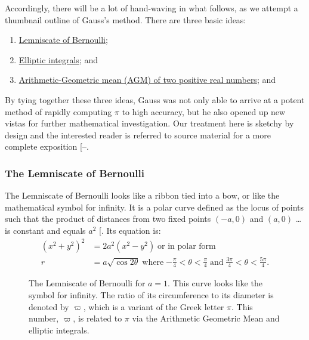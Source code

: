 \documentclass[
  a4paper,
]{article}
\begin{document}
Accordingly, there will be a lot of hand-waving in what follows, as we
attempt a thumbnail outline of Gauss's method. There are three basic
ideas:

\begin{enumerate}
\def\labelenumi{(\alph{enumi})}
\item
  \href{https://mathworld.wolfram.com/Lemniscate.html}{Lemniscate of
  Bernoulli};
\item
  \href{https://en.wikipedia.org/wiki/Elliptic_integral}{Elliptic
  integrals}; and
\item
  \href{https://en.wikipedia.org/wiki/Arithmetic\%E2\%80\%93geometric_mean}{Arithmetic-Geometric
  mean (AGM) of two positive real numbers}; and
\end{enumerate}

By tying together these three ideas, Gauss was not only able to arrive
at a potent method of rapidly computing \(\pi\) to high accuracy, but he
also opened up new vistas for further mathematical investigation. Our
treatment here is sketchy by design and the interested reader is
referred to source material for a more complete exposition
{[}--\citeproc{ref-langton-2001}{34}{]}.

\subsubsection{The Lemniscate of
Bernoulli}\label{the-lemniscate-of-bernoulli}

The Lemniscate of Bernoulli looks like a ribbon tied into a bow, or like
the mathematical symbol for infinity. It is a polar curve defined as the
locus of points such that the product of distances from two fixed points
\((-a, 0)\) and \((a, 0)\) \ldots is constant and equals \(a^2\)
{[}\citeproc{ref-lemniscate-mathworld}{35}{]}. Its equation is: \[
\begin{aligned}
(x^2 + y^2)^2 &= 2a^2(x^2 - y^2)\; \text{or in polar form}\\
r &= a\sqrt{\cos2\theta} \; \text{where}\; \textstyle{-\frac{\pi}{4} < \theta < \frac{\pi}{4}\; \text{and}\; \frac{3\pi}{4} < \theta < \frac{5\pi}{4}}.
\end{aligned}
\]

\begin{figure}
\centering

\caption{The Lemniscate of Bernoulli for \(a = 1\). This curve looks
like the symbol for infinity. The ratio of its circumference to its
diameter is denoted by \(\varpi\), which is a variant of the Greek
letter \(\pi\). This number, \(\varpi\), is related to \(\pi\) via the
Arithmetic Geometric Mean and elliptic integrals.}\label{fig:lemniscate}
\end{figure}
\end{document}
